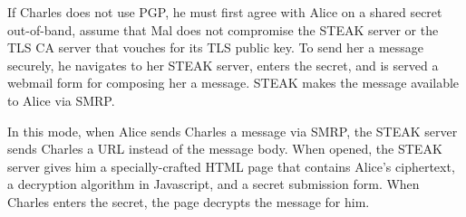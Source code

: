 If Charles does not use PGP, he must first agree with Alice on a shared secret out-of-band, assume that Mal does not compromise the STEAK server or the TLS CA server that vouches for its TLS public key.  To send her a message securely, he navigates to her STEAK server, enters the secret, and is served a webmail form for composing her a message.  STEAK makes the message available to Alice via SMRP.

In this mode, when Alice sends Charles a message via SMRP, the STEAK server sends Charles a URL instead of the message body.  When opened, the STEAK server gives him a specially-crafted HTML page that contains Alice’s ciphertext, a decryption algorithm in Javascript, and a secret submission form.  When Charles enters the secret, the page decrypts the message for him.
